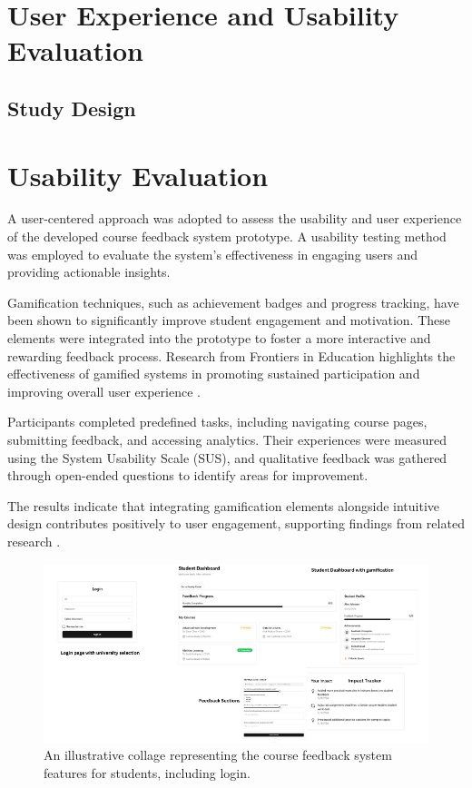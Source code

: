 \documentclass[conference]{IEEEtran}
\begin{document}
\section{User Experience and Usability Evaluation}
\subsection{Study Design}

\section{Usability Evaluation}

A user-centered approach was adopted to assess the usability and user experience of the developed course feedback system prototype. A usability testing method was employed to evaluate the system's effectiveness in engaging users and providing actionable insights.

Gamification techniques, such as achievement badges and progress tracking, have been shown to significantly improve student engagement and motivation. These elements were integrated into the prototype to foster a more interactive and rewarding feedback process. Research from Frontiers in Education highlights the effectiveness of gamified systems in promoting sustained participation and improving overall user experience \cite{10.3389/feduc.2024.1466926}.

Participants completed predefined tasks, including navigating course pages, submitting feedback, and accessing analytics. Their experiences were measured using the System Usability Scale (SUS), and qualitative feedback was gathered through open-ended questions to identify areas for improvement.

The results indicate that integrating gamification elements alongside intuitive design contributes positively to user engagement, supporting findings from related research \cite{10.3389/feduc.2024.1466926}.

\begin{figure}[!h]
    \centering
    \includegraphics[width=\textwidth]{features.png}
    \caption{An illustrative collage representing the course feedback system features for students, including login.}
    \label{fig:student_features}
\end{figure}
\end{document}
